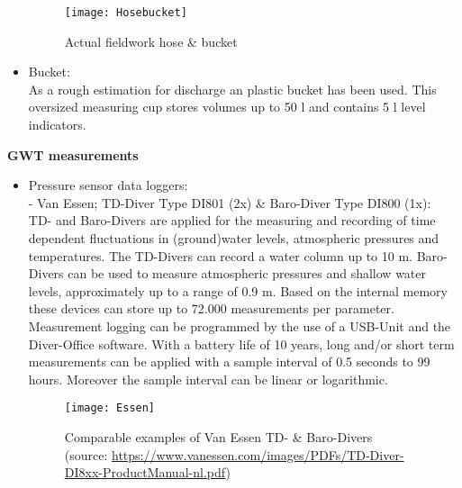 \begin{itemize}
\begin{figure}[h!]
 \centering\texttt{[image: Hosebucket]}
 \captionsetup{justification=centering}
 \caption{Actual fieldwork hose \& bucket}
 \label{fig:Hosebucket}
\end{figure}

\item Bucket: \\
As a rough estimation for discharge an  plastic bucket has been used. This oversized measuring cup stores volumes up to 50 l and contains 5 l level indicators. 

\end{itemize}

\bigskip
\textbf{GWT measurements} 

\begin{itemize}
\item Pressure sensor data loggers: \\
\-- Van Essen; TD-Diver Type DI801 (2x) \& Baro-Diver Type DI800 (1x):\\
TD- and Baro-Divers are applied for the measuring and recording of time dependent fluctuations in (ground)water levels, atmospheric pressures and temperatures. The TD-Divers can record a water column up to 10 m. Baro-Divers can be used to measure atmospheric pressures and shallow water levels, approximately up to a range of 0.9 m. Based on the internal memory these devices can store up to 72.000 measurements per parameter. Measurement logging can be programmed by the use of a USB-Unit and the Diver-Office software. With a battery life of 10 years, long and/or short term measurements can be applied with a sample interval of 0.5 seconds to 99 hours. Moreover the sample interval can be linear or logarithmic.

\begin{figure}[h!]
 \centering\texttt{[image: Essen]}
 \captionsetup{justification=centering}
 \caption[Comparable examples of Van Essen TD- \& Baro-Divers]{Comparable examples of Van Essen TD- \& Baro-Divers \\(source: \url{https://www.vanessen.com/images/PDFs/TD-Diver-DI8xx-ProductManual-nl.pdf})}
 \label{fig:Essen}
\end{figure}


\end{itemize}
